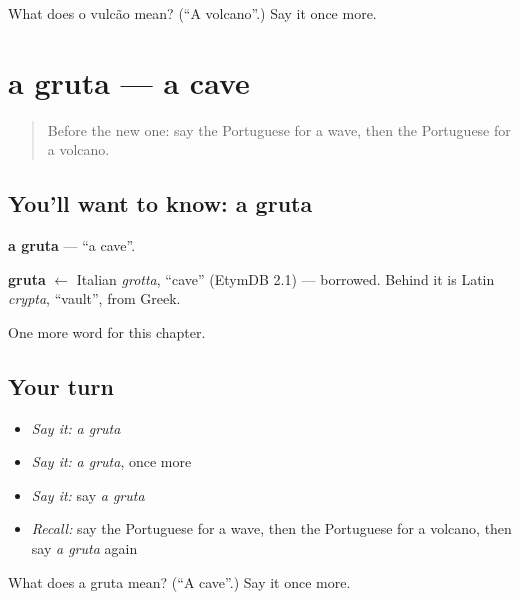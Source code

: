 \begin{tcolorbox}[breakable,colback=teal!4,colframe=teal!35!black,title={Before you move on}]
What does o vulcão mean? (\textquotedblleft{}A volcano\textquotedblright{}.) Say it once more.
\end{tcolorbox}
\section[a gruta]{a gruta — a cave}

\label{lesson:PT-C117-gruta}



\begin{quote}
Before the new one: say the Portuguese for a wave, then the Portuguese for a volcano.
\end{quote}

\subsection*{You'll want to know: a gruta}
\textbf{a gruta} — \textquotedblleft{}a cave\textquotedblright{}.

\begin{cousinweb}
\textbf{gruta} $\leftarrow$ Italian \emph{grotta}, \textquotedblleft{}cave\textquotedblright{} (EtymDB 2.1) — borrowed. Behind it is Latin \emph{crypta}, \textquotedblleft{}vault\textquotedblright{}, from Greek.
\end{cousinweb}

\begin{grammarlens}[title={What you've built}]
One more word for this chapter.
\end{grammarlens}

\subsection*{Your turn}
\begin{itemize}
\raggedright
  \item \emph{Say it:} \emph{a gruta}
  \item \emph{Say it:} \emph{a gruta}, once more
  \item \emph{Say it:} say \emph{a gruta}
  \item \emph{Recall:} say the Portuguese for a wave, then the Portuguese for a volcano, then say \emph{a gruta} again
\end{itemize}

\begin{tcolorbox}[breakable,colback=teal!4,colframe=teal!35!black,title={Before you move on}]
What does a gruta mean? (\textquotedblleft{}A cave\textquotedblright{}.) Say it once more.
\end{tcolorbox}
